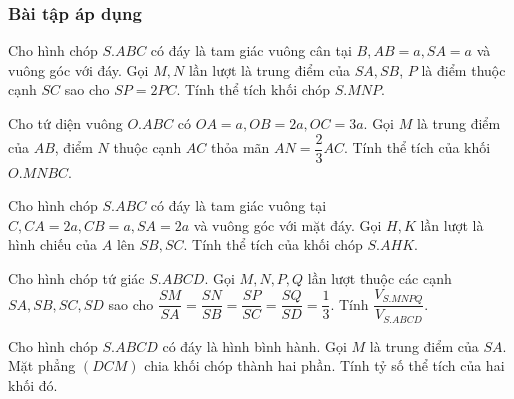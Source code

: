 \subsubsection{Bài tập áp dụng}
\begin{bt}%
	Cho hình chóp $S.ABC$ có đáy là tam giác vuông cân tại $B, AB=a, SA=a$ và vuông góc với đáy. Gọi $M,N$ lần lượt là trung điểm của $SA, SB$, $P$ là điểm thuộc cạnh $SC$ sao cho $SP=2PC$. Tính thể tích khối chóp $S.MNP$.
\end{bt}
\begin{bt}%
	Cho tứ diện vuông $O.ABC$ có $OA=a, OB=2a, OC=3a$. Gọi $M$ là trung điểm của $AB$, điểm $N$ thuộc cạnh $AC$ thỏa mãn $AN=\dfrac{2}{3}AC$. Tính thể tích của khối $O.MNBC$.
\end{bt}
\begin{bt}%
	Cho hình chóp $S.ABC$ có đáy là tam giác vuông tại $C, CA=2a, CB=a, SA=2a$ và vuông góc với mặt đáy. Gọi $H,K$ lần lượt là hình chiếu của $A$ lên $SB, SC$. Tính thể tích của khối chóp $S.AHK$.
\end{bt}
\begin{bt}%
	Cho hình chóp tứ giác $S.ABCD$. Gọi $M,N,P,Q$ lần lượt thuộc các cạnh $SA, SB,SC,SD$ sao cho $\dfrac{SM}{SA}=\dfrac{SN}{SB}=\dfrac{SP}{SC}=\dfrac{SQ}{SD}=\dfrac{1}{3}$. Tính $\dfrac{V_{S.MNPQ}}{V_{S.ABCD}}$.
\end{bt}
\begin{bt}%
	Cho hình chóp $S.ABCD$ có đáy là hình bình hành. Gọi $M$ là trung điểm của $SA$. Mặt phẳng $(DCM)$ chia khối chóp thành hai phần. Tính tỷ số thể tích của hai khối đó.
\end{bt}
